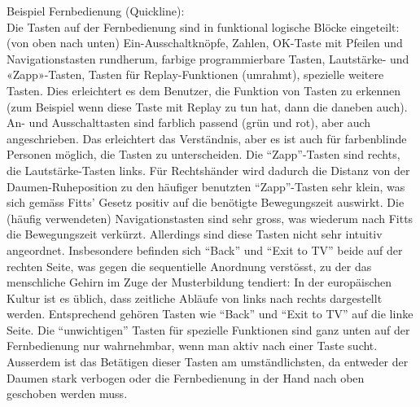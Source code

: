 

Beispiel Fernbedienung (Quickline):\\
Die Tasten auf der Fernbedienung sind in funktional logische Blöcke eingeteilt: (von oben nach unten) Ein-Ausschaltknöpfe, Zahlen, OK-Taste mit Pfeilen und Navigationstasten rundherum, farbige programmierbare Tasten, Lautstärke- und «Zapp»-Tasten, Tasten für Replay-Funktionen (umrahmt), spezielle weitere Tasten. Dies erleichtert es dem Benutzer, die Funktion von Tasten zu erkennen (zum Beispiel wenn diese Taste mit Replay zu tun hat, dann die daneben auch).
An- und Ausschalttasten sind farblich passend (grün und rot), aber auch angeschrieben. Das erleichtert das Verständnis, aber es ist auch für farbenblinde Personen möglich, die Tasten zu unterscheiden.
Die \enquote{Zapp}-Tasten sind rechts, die Lautstärke-Tasten links. Für Rechtshänder wird dadurch die Distanz von der Daumen-Ruheposition zu den häufiger benutzten \enquote{Zapp}-Tasten sehr klein, was sich gemäss Fitts' Gesetz positiv auf die benötigte Bewegungszeit auswirkt.
Die (häufig verwendeten) Navigationstasten sind sehr gross, was wiederum nach Fitts die Bewegungszeit verkürzt.
Allerdings sind diese Tasten nicht sehr intuitiv angeordnet. Insbesondere befinden sich \enquote{Back} und \enquote{Exit to TV} beide auf der rechten Seite, was gegen die sequentielle Anordnung verstösst, zu der das menschliche Gehirn im Zuge der Musterbildung tendiert: In der europäischen Kultur ist es üblich, dass zeitliche Abläufe von links nach rechts dargestellt werden. Entsprechend gehören Tasten wie \enquote{Back} und \enquote{Exit to TV} auf die linke Seite.
Die \enquote{unwichtigen} Tasten für spezielle Funktionen sind ganz unten auf der Fernbedienung nur wahrnehmbar, wenn man aktiv nach einer Taste sucht. 
Ausserdem ist das Betätigen dieser Tasten am umständlichsten, da entweder der Daumen stark verbogen oder die Fernbedienung in der Hand nach oben geschoben werden muss.

